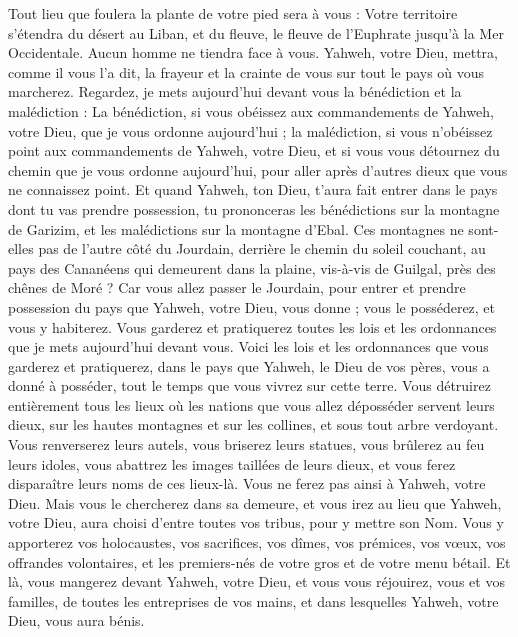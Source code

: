 \begin{multicols}{2}
Tout lieu que foulera la plante de votre pied sera à vous : Votre territoire s'étendra du désert au Liban, et du fleuve, le fleuve de l'Euphrate jusqu'à la Mer Occidentale.
Aucun homme ne tiendra face à vous. Yahweh, votre Dieu, mettra, comme il vous l'a dit, la frayeur et la crainte de vous sur tout le pays où vous marcherez.
Regardez, je mets aujourd'hui devant vous la bénédiction et la malédiction :
La bénédiction, si vous obéissez aux commandements de Yahweh, votre Dieu, que je vous ordonne aujourd'hui ;
la malédiction, si vous n'obéissez point aux commandements de Yahweh, votre Dieu, et si vous vous détournez du chemin que je vous ordonne aujourd'hui, pour aller après d'autres dieux que vous ne connaissez point.
Et quand Yahweh, ton Dieu, t'aura fait entrer dans le pays dont tu vas prendre possession, tu prononceras les bénédictions sur la montagne de Garizim, et les malédictions sur la montagne d'Ebal.
Ces montagnes ne sont-elles pas de l'autre côté du Jourdain, derrière le chemin du soleil couchant, au pays des Cananéens qui demeurent dans la plaine, vis-à-vis de Guilgal, près des chênes de Moré ?
Car vous allez passer le Jourdain, pour entrer et prendre possession du pays que Yahweh, votre Dieu, vous donne ; vous le posséderez, et vous y habiterez.
Vous garderez et pratiquerez toutes les lois et les ordonnances que je mets aujourd'hui devant vous.
\VerseOne{}Voici les lois et les ordonnances que vous garderez et pratiquerez, dans le pays que Yahweh, le Dieu de vos pères, vous a donné à posséder, tout le temps que vous vivrez sur cette terre.
Vous détruirez entièrement tous les lieux où les nations que vous allez déposséder servent leurs dieux, sur les hautes montagnes et sur les collines, et sous tout arbre verdoyant.
Vous renverserez leurs autels, vous briserez leurs statues, vous brûlerez au feu leurs idoles, vous abattrez les images taillées de leurs dieux, et vous ferez disparaître leurs noms de ces lieux-là.
Vous ne ferez pas ainsi à Yahweh, votre Dieu.
Mais vous le chercherez dans sa demeure, et vous irez au lieu que Yahweh, votre Dieu, aura choisi d'entre toutes vos tribus, pour y mettre son Nom.
Vous y apporterez vos holocaustes, vos sacrifices, vos dîmes, vos prémices, vos vœux, vos offrandes volontaires, et les premiers-nés de votre gros et de votre menu bétail.
Et là, vous mangerez devant Yahweh, votre Dieu, et vous vous réjouirez, vous et vos familles, de toutes les entreprises de vos mains, et dans lesquelles Yahweh, votre Dieu, vous aura bénis.

\end{multicols}
